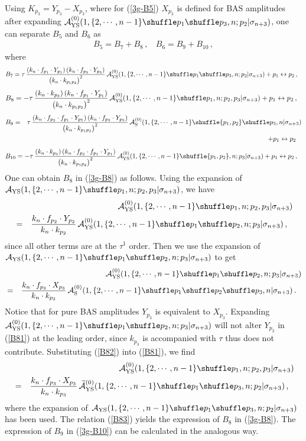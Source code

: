 \documentclass[11pt,a4paper]{article}
\newcommand{\bea}{\begin{eqnarray}}
\newcommand{\eea}{\end{eqnarray}}
\newcommand{\nn}{\nonumber \\}
\def\W #1{\widetilde{#1}}
\def\eref#1{(\ref{#1})}
\begin{document}
Using $K_{p_3}=Y_{p_3}-X_{p_3}$, where for \eref{3g-B5} $X_{p_3}$ is defined for BAS amplitudes after expanding ${\cal A}^{(0)}_{\rm YS}(1,\{2,\cdots,n-1\}\shuffle p_1\shuffle p_3,n;p_2|\sigma_{n+3})$, one can separate $B_5$ and $B_6$ as
%
\bea
B_5=B_7+B_8\,,~~~~B_6=B_9+B_{10}\,,
\eea
%
where
%
\bea
B_7=\tau\,{(k_n\cdot f_{p_1}\cdot Y_{p_1})\,(k_n\cdot f_{p_3}\cdot Y_{p_3})\over \big(k_n\cdot k_{p_1p_2}\big)^2}\,{\cal A}^{(0)}_{\rm YS}(1,\{2,\cdots,n-1\}\shuffle p_1\shuffle p_3,n;p_2|\sigma_{n+3})+p_1\leftrightarrow p_2\,,~~\label{3g-B7}
\eea
%
%
\bea
B_8=-\tau\,{(k_n\cdot k_{p_3})\,(k_n\cdot f_{p_1}\cdot Y_{p_1})\over \big(k_n\cdot k_{p_1p_2}\big)^2}\,{\cal A}^{(0)}_{\rm YS}(1,\{2,\cdots,n-1\}\shuffle p_1,n;p_2,p_3|\sigma_{n+3})+p_1\leftrightarrow p_2\,,~~\label{3g-B8}
\eea
%
%
\bea
B_9&=&\tau\,{(k_n\cdot f_{p_2}\cdot f_{p_1}\cdot Y_{p_1})\,(k_n\cdot f_{p_3}\cdot Y_{p_3})\over \big(k_n\cdot k_{p_1p_2}\big)^2}\,{\cal A}^{(0)}_{\rm S}(1,\{2,\cdots,n-1\}\shuffle \{p_1,p_2\}\shuffle p_3,n|\sigma_{n+3})\nn
& &+p_1\leftrightarrow p_2\,~~\label{3g-B9}
\eea
%
%
\bea
B_{10}=-\tau\,{(k_n\cdot k_{p_3})\,(k_n\cdot f_{p_2}\cdot f_{p_1}\cdot Y_{p_1})\over \big(k_n\cdot k_{p_1p_2}\big)^2}\,{\cal A}^{(0)}_{\rm YS}(1,\{2,\cdots,n-1\}\shuffle \{p_1,p_2\},n;p_3|\sigma_{n+3})+p_1\leftrightarrow p_2\,,~~\label{3g-B10}
\eea
%
One can obtain $B_8$ in \eref{3g-B8} as follows. Using the expansion of ${\cal A}_{\rm YS}(1,\{2,\cdots,n-1\}\shuffle p_1,n;p_2,p_3|\sigma_{n+3})$, we have
%
\bea
& &{\cal A}^{(0)}_{\rm YS}(1,\{2,\cdots,n-1\}\shuffle p_1,n;p_2,p_3|\sigma_{n+3})\nn
&=&{k_n\cdot f_{p_2}\cdot Y_{p_2}\over k_n\cdot k_{p_2}}\,{\cal A}^{(0)}_{\rm YS}(1,\{2,\cdots,n-1\}\shuffle p_1\shuffle p_2,n;p_3|\sigma_{n+3})\,,~~\label{B81}
\eea
%
since all other terms are at the $\tau^1$ order. Then we use the expansion of ${\cal A}_{\rm YS}(1,\{2,\cdots,n-1\}\shuffle p_1\shuffle p_2,n;p_3|\sigma_{n+3})$ to get
%
\bea
& &{\cal A}^{(0)}_{\rm YS}(1,\{2,\cdots,n-1\}\shuffle p_1\shuffle p_2,n;p_3|\sigma_{n+3})\nn
&=&{k_n\cdot f_{p_3}\cdot X_{p_3}\over k_n\cdot k_{p_3}}\,{\cal A}^{(0)}_{\rm S}(1,\{2,\cdots,n-1\}\shuffle p_1\shuffle p_2\shuffle p_3,n|\sigma_{n+3})\,.~~\label{B82}
\eea
%
Notice that for pure BAS amplitudes $Y_{p_3}$ is equivalent to $X_{p_3}$. Expanding ${\cal A}^{(0)}_{\rm YS}(1,\{2,\cdots,n-1\}\shuffle p_1\shuffle p_2,n;p_3|\sigma_{n+3})$ will not alter $Y_{p_2}$ in \eref{B81} at the leading order, since $k_{p_3}$
is accompanied with $\tau$ thus does not contribute. Substituting \eref{B82} into \eref{B81}, we find
%
\bea
& &{\cal A}^{(0)}_{\rm YS}(1,\{2,\cdots,n-1\}\shuffle p_1,n;p_2,p_3|\sigma_{n+3})\nn
&=&{k_n\cdot f_{p_3}\cdot X_{p_3}\over k_n\cdot k_{p_3}}\,\W{\cal A}^{(0)}_{\rm YS}(1,\{2,\cdots,n-1\}\shuffle p_1\shuffle p_3,n;p_2|\sigma_{n+3})\,,~~\label{B83}
\eea
%
where the expansion of ${\cal A}_{\rm YS}(1,\{2,\cdots,n-1\}\shuffle p_1\shuffle p_3,n;p_2|\sigma_{n+3})$ has been used. The relation \eref{B83} yields the expression of $B_8$ in \eref{3g-B8}. The expression of $B_9$ in \eref{3g-B10} can be calculated in the analogous way.
\end{document}
